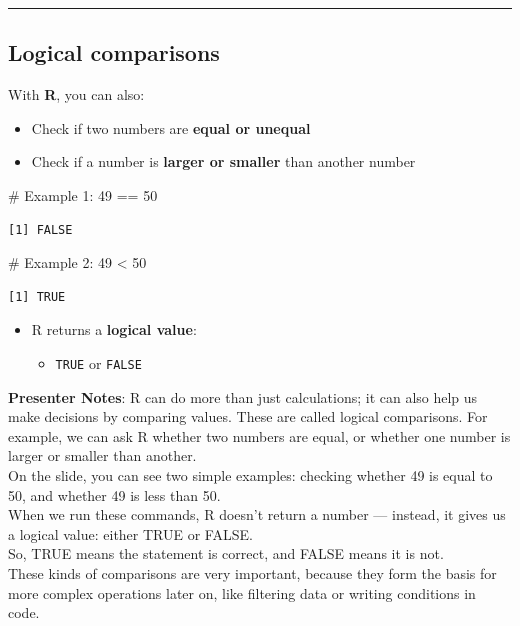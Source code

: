 \documentclass[
  letterpaper,
  DIV=11,
  numbers=noendperiod]{scrartcl}
\newenvironment{Shaded}{\begin{snugshade}}{\end{snugshade}}
\newcommand{\CommentTok}[1]{\textcolor[rgb]{0.37,0.37,0.37}{#1}}
\newcommand{\DecValTok}[1]{\textcolor[rgb]{0.68,0.00,0.00}{#1}}
\newcommand{\SpecialCharTok}[1]{\textcolor[rgb]{0.37,0.37,0.37}{#1}}
\providecommand{\tightlist}{%
  \setlength{\itemsep}{0pt}\setlength{\parskip}{0pt}}
\begin{document}
\begin{center}\rule{0.5\linewidth}{0.5pt}\end{center}

\subsection{Logical comparisons}\label{logical-comparisons}

With \textbf{R}, you can also:

\begin{itemize}
\item
  Check if two numbers are \textbf{equal or unequal}
\item
  Check if a number is \textbf{larger or smaller} than another number
\end{itemize}

\begin{Shaded}
\begin{Highlighting}[]
\CommentTok{\# Example 1:}
\DecValTok{49} \SpecialCharTok{==} \DecValTok{50}
\end{Highlighting}
\end{Shaded}

\begin{verbatim}
[1] FALSE
\end{verbatim}

\begin{Shaded}
\begin{Highlighting}[]
\CommentTok{\# Example 2:}
\DecValTok{49} \SpecialCharTok{\textless{}} \DecValTok{50} 
\end{Highlighting}
\end{Shaded}

\begin{verbatim}
[1] TRUE
\end{verbatim}

\begin{itemize}
\item
  R returns a \textbf{logical value}:

  \begin{itemize}
  \tightlist
  \item
    \texttt{TRUE} or \texttt{FALSE}
  \end{itemize}
\end{itemize}

\textbf{Presenter Notes}: R can do more than just calculations; it can
also help us make decisions by comparing values. These are called
logical comparisons. For example, we can ask R whether two numbers are
equal, or whether one number is larger or smaller than another.\\
On the slide, you can see two simple examples: checking whether 49 is
equal to 50, and whether 49 is less than 50.\\
When we run these commands, R doesn't return a number --- instead, it
gives us a logical value: either TRUE or FALSE.\\
So, TRUE means the statement is correct, and FALSE means it is not.\\
These kinds of comparisons are very important, because they form the
basis for more complex operations later on, like filtering data or
writing conditions in code.
\end{document}

